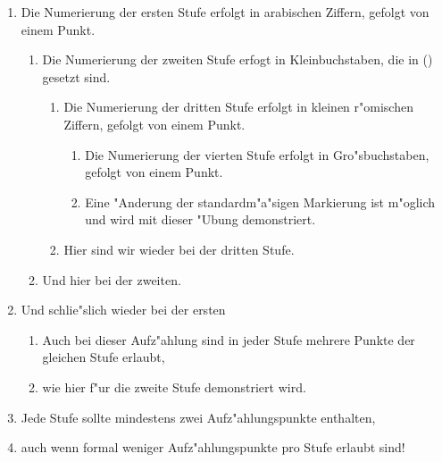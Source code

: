 \documentclass{article}
\begin{document}
\begin{enumerate}
\item Die Numerierung der ersten Stufe erfolgt in arabischen Ziffern,
      gefolgt von einem Punkt.
\begin{enumerate}
\item Die Numerierung der zweiten Stufe erfogt in Kleinbuchstaben,
      die in () gesetzt sind.
\begin{enumerate}
\item Die Numerierung der dritten Stufe erfolgt in kleinen r"omischen
      Ziffern, gefolgt von einem Punkt.
\begin{enumerate}
\item Die Numerierung der vierten Stufe erfolgt in Gro"sbuchstaben, gefolgt
      von einem Punkt.
\item Eine "Anderung der standardm"a"sigen Markierung ist m"oglich und wird
      mit dieser "Ubung demonstriert.
\end{enumerate}
\item Hier sind wir wieder bei der dritten Stufe.
\end{enumerate}
\item Und hier bei der zweiten.
\end{enumerate}
\item Und schlie"slich wieder bei der ersten
\begin{enumerate}
\item Auch bei dieser Aufz"ahlung sind in jeder Stufe mehrere Punkte
      der gleichen Stufe erlaubt,
\item wie hier f"ur die zweite Stufe demonstriert wird.
\end{enumerate}
\item Jede Stufe sollte mindestens zwei Aufz"ahlungspunkte enthalten,
\item auch wenn formal weniger Aufz"ahlungspunkte pro Stufe erlaubt sind!
\end{enumerate}
\end{document}
